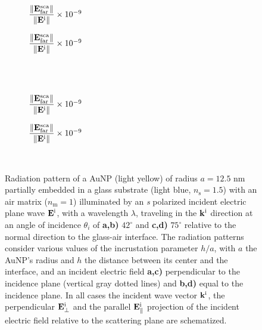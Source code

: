 \begin{figure}[h!]
    \centering
    \def\svgwidth{.8\textwidth}
    \hspace*{-.2\textwidth}%
    \vspace*{-3.85em}%
        \begin{subfigure}{.4\textwidth}\caption{%
                    \footnotesize$\dfrac{\norm{\vb{E}^\text{sca}_\text{far}}}{\norm{\vb{E}^\text{i}}} \times 10^{-9}$  }\label{sfig:Far:Inc:s:a}\end{subfigure}%
        \begin{subfigure}{.4\textwidth}\caption{%
                    \footnotesize$\dfrac{\norm{\vb{E}^\text{sca}_\text{far}}}{\norm{\vb{E}^\text{i}}} \times 10^{-9}$  }\label{sfig:Far:Inc:s:b}\end{subfigure}\\
    \\[-.75em]
    \def\svgwidth{.8\textwidth}
    \hspace*{-.21\textwidth}%
    \vspace*{-.85em}%
        \begin{subfigure}{.4\textwidth}\caption{%
                    \footnotesize$\dfrac{\norm{\vb{E}^\text{sca}_\text{far}}}{\norm{\vb{E}^\text{i}}} \times 10^{-9}$  }\label{sfig:Far:Inc:s:c}\end{subfigure}%
        \begin{subfigure}{.4\textwidth}\caption{%
                    \footnotesize$\dfrac{\norm{\vb{E}^\text{sca}_\text{far}}}{\norm{\vb{E}^\text{i}}} \times 10^{-9}$  }\label{sfig:Far:Inc:s:d}\end{subfigure}\\
    \caption[  Radiation pattern of a AuNP supported on a substrate illuminated at oblique incidence ]{%
    Radiation pattern of a AuNP (light yellow) of radius $a = 12.5$ nm partially embedded in a glass substrate (light blue, $n_\text{s} = 1.5$) with an air matrix ($n_\text{m} = 1$) illuminated by an \textit{s} polarized incident electric plane wave $\vb{E}^\text{i}$, with a wavelength $\lambda$, traveling in the $\vb{k}^\text{i}$ direction at an angle of incidence $\theta_i$ of \textbf{a,b)} $42^\circ$ and \textbf{c,d)} $75^\circ$ relative to the normal direction to the glass-air interface. The radiation patterns consider various values of the incrustation parameter $h/a$, with $a$ the AuNP's radius and $h$ the distance between its center and the interface, and an  incident electric field \textbf{a,c)} perpendicular to the incidence plane (vertical gray dotted lines) and \textbf{b,d)} equal to the incidence plane. In all cases the incident wave vector $\vb{k}^\text{i}$, the perpendicular $\vb{E}_\perp^\text{i}$ and the  parallel $\vb{E}_\parallel^\text{i}$ projection of the incident electric field relative to the scattering plane are schematized.%
     }
    \label{fig:Far:Inc:s}
\end{figure}







